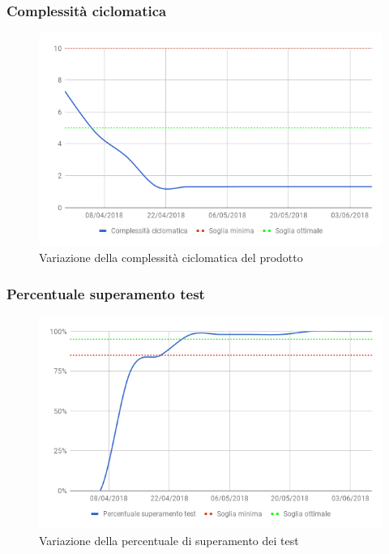 		\subsubsection{Complessità ciclomatica}
		
		\begin{figure}[H]{\textwidth}
  			\centering
  			\includegraphics[width=1\linewidth]{./img/Risultati/ComplessitaCiclomatica.png}
	  		\caption[Variazione complessità ciclomatica]{Variazione della complessità ciclomatica del prodotto}
		\end{figure}
		
		\subsubsection{Percentuale superamento test}
		
		\begin{figure}[H]{\textwidth}
  			\centering
  			\includegraphics[width=1\linewidth]{./img/Risultati/SuperamentoTest.png}
	  		\caption[Variazione percentuale superamento dei test]{Variazione della percentuale di superamento dei test}
		\end{figure}
		
